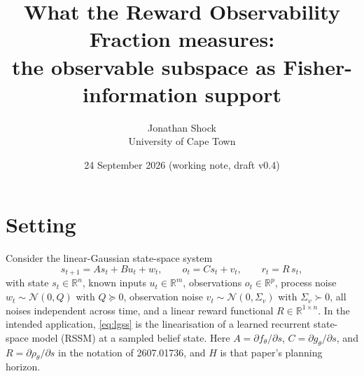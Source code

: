 \documentclass[11pt]{article}
\title{What the Reward Observability Fraction measures:\\ the observable subspace as Fisher-information support}
\author{Jonathan Shock\\University of Cape Town}
\date{24 September 2026 (working note, draft v0.4)}
\theoremstyle{remark}
\newcommand{\R}{\mathbb{R}}
\newcommand{\ROF}{\mathrm{ROF}}
\begin{document}
\maketitle


\section{Setting}

Consider the linear-Gaussian state-space system
\begin{equation}
s_{t+1} = A s_t + B u_t + w_t, \qquad
o_t = C s_t + v_t, \qquad
r_t = R\, s_t,
\label{eq:lgss}
\end{equation}
with state $s_t \in \R^n$, known inputs $u_t \in \R^m$, observations $o_t \in \R^p$, process noise $w_t \sim \mathcal N(0, Q)$ with $Q \succeq 0$, observation noise $v_t \sim \mathcal N(0, \Sigma_v)$ with $\Sigma_v \succ 0$, all noises independent across time, and a linear reward functional $R \in \R^{1\times n}$. In the intended application, \eqref{eq:lgss} is the linearisation of a learned recurrent state-space model (RSSM) at a sampled belief state. Here $A = \partial f_\theta/\partial s$, $C = \partial g_\theta/\partial s$, and $R = \partial \rho_\theta / \partial s$ in the notation of 2607.01736, and $H$ is that paper's planning horizon.
\end{document}
